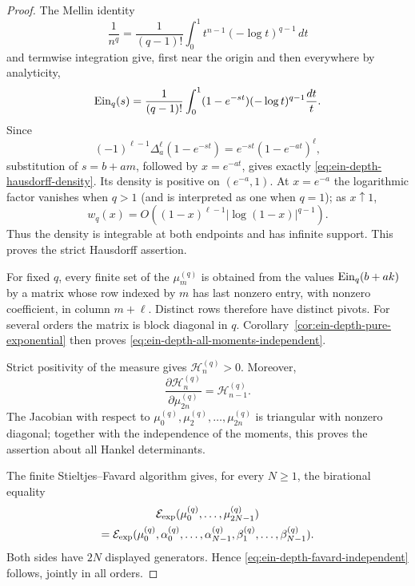 \begin{proof}
The Mellin identity
\[
 \frac1{n^q}=\frac1{(q-1)!}
 \int_0^1t^{n-1}(-\log t)^{q-1}\,dt
\]
and termwise integration give, first near the origin and then everywhere
by analyticity,
\begin{equation}\label{eq:ein-depth-mellin-integral}
 \operatorname{Ein}_{q}(s)=\frac1{(q-1)!}
 \int_0^1(1-e^{-st})(-\log t)^{q-1}\frac{dt}{t}.
\end{equation}
Since
\[
 (-1)^{\ell-1}\Delta_a^\ell(1-e^{-st})
 =e^{-st}(1-e^{-at})^\ell,
\]
substitution of \(s=b+am\), followed by \(x=e^{-at}\), gives exactly
\eqref{eq:ein-depth-hausdorff-density}.  Its density is positive on
\((e^{-a},1)\).  At \(x=e^{-a}\) the logarithmic factor vanishes when
\(q>1\) (and is interpreted as one when \(q=1\)); as \(x\uparrow1\),
\[
 w_q(x)=O\!\left((1-x)^{\ell-1}
             \left|\log(1-x)\right|^{q-1}\right).
\]
Thus the density is integrable at both endpoints and has infinite support.
This proves the strict Hausdorff assertion.

For fixed \(q\), every finite set of the \(\mu_m^{(q)}\) is obtained from
the values
\(\operatorname{Ein}_{q}(b+ak)\) by a matrix whose row indexed by \(m\) has last
nonzero entry, with nonzero coefficient, in column \(m+\ell\).  Distinct
rows therefore have distinct pivots.  For several orders the matrix is
block diagonal in \(q\).  Corollary~\ref{cor:ein-depth-pure-exponential}
then proves \eqref{eq:ein-depth-all-moments-independent}.

Strict positivity of the measure gives \(\mathcal H_n^{(q)}>0\).  Moreover,
\begin{equation}\label{eq:ein-depth-hankel-triangular-jacobian}
 \frac{\partial\mathcal H_n^{(q)}}
      {\partial\mu_{2n}^{(q)}}=\mathcal H_{n-1}^{(q)}.
\end{equation}
The Jacobian with respect to
\(\mu_0^{(q)},\mu_2^{(q)},\ldots,\mu_{2n}^{(q)}\) is triangular with
nonzero diagonal; together with the independence of the moments, this
proves the assertion about all Hankel determinants.

The finite Stieltjes--Favard algorithm gives, for every \(N\geq1\), the
birational equality
\begin{multline}\label{eq:ein-depth-moment-favard-fields}
 \mathcal E_{\mathrm{exp}}(\mu_0^{(q)},\ldots,\mu_{2N-1}^{(q)})\\
 =\mathcal E_{\mathrm{exp}}(\mu_0^{(q)},
   \alpha_0^{(q)},\ldots,\alpha_{N-1}^{(q)},
   \beta_1^{(q)},\ldots,\beta_{N-1}^{(q)}).
\end{multline}
Both sides have \(2N\) displayed generators.  Hence
\eqref{eq:ein-depth-favard-independent} follows, jointly in all orders.


\end{proof}
